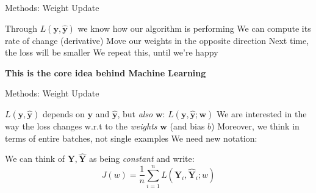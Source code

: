 \begin{slide}{Methods: Weight Update}
  \centering
\begin{itemize}
  \pitem Through $L(\mathbf{y}, \mathbf{\hat{y}})$ we know how our algorithm is performing
  \pitem We can compute its rate of change (derivative)
  \pitem Move our weights in the opposite direction
  \pitem Next time, the loss will be smaller
  \pitem We repeat this, until we're happy
\end{itemize}

\pause
\vspace{1cm}
\textbf{This is the core idea behind Machine Learning}
\end{slide}

\begin{slide}{Methods: Weight Update}
  \centering
  \begin{itemize}
    \pitem $L(\mathbf{y}, \mathbf{\hat{y}})$ depends on $\mathbf{y}$ and $\mathbf{\hat{y}}$, but \emph{also} $\mathbf{w}$: $L(\mathbf{y}, \mathbf{\hat{y}}; \mathbf{w})$
    \pitem We are interested in the way the loss changes w.r.t to the \emph{weights} $\mathbf{w}$ (and bias $b$) %
    \pitem Moreover, we think in terms of entire batches, not single examples
    \pitem We need new notation:
  \end{itemize}
  \vspace{0.5cm}
  \pause
  We can think of $\mathbf{Y}, \mathbf{\hat{Y}}$ as being \emph{constant} and write:
  $$J(w) = \frac{1}{n}\sum_{i=1}^n L(\mathbf{Y}_i, \mathbf{\hat{Y}}_i; w)$$
\end{slide}


